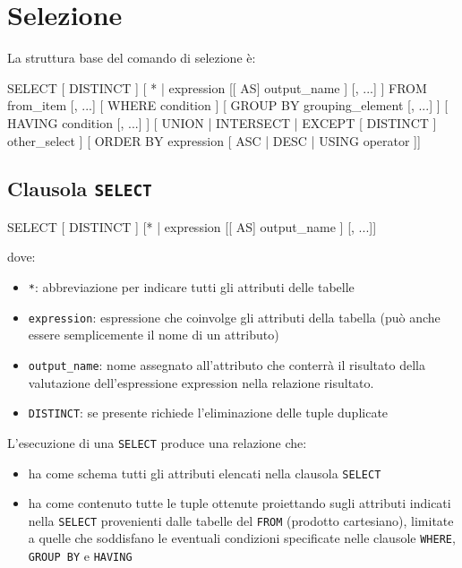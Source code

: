 \section{Selezione}
La struttura base del comando di selezione è:
\begin{codiceSQL}
SELECT [ DISTINCT ]
[ * | expression [[ AS] output_name ] [, 
...] ]
FROM from_item [, ...] 
  [ WHERE condition ]
    [ GROUP BY grouping_element [, ...] ]
      [ HAVING condition [, ...] ]
      [ { UNION | INTERSECT | EXCEPT } [ DISTINCT
      ] other_select ]
        [ ORDER BY expression [ ASC | DESC | USING 
        operator ]]
\end{codiceSQL}


\subsection{Clausola \texttt{SELECT}}
\begin{codiceSQL}
SELECT [ DISTINCT ]
[{* | expression [[ AS] output_name ]} [, ...]]
\end{codiceSQL}

dove:
\begin{itemize}[label=$\triangleright$, itemsep=\smallskipamount]
  \item \texttt{*}: abbreviazione per indicare tutti gli attributi delle tabelle
  \item \texttt{expression}: espressione che coinvolge gli attributi della tabella (può anche essere semplicemente il nome di un attributo)
  \item \texttt{output\_name}: nome assegnato all’attributo che conterrà il risultato della valutazione dell’espressione expression nella relazione risultato.
  \item \texttt{DISTINCT}: se presente richiede l’eliminazione delle tuple duplicate
\end{itemize}

\smallskip
L’esecuzione di una \texttt{SELECT} produce una relazione che:
\begin{itemize}[label=$\circ$, itemsep=\smallskipamount]
  \item ha come schema tutti gli attributi elencati nella clausola \texttt{SELECT}
  \item ha come contenuto tutte le tuple ottenute proiettando sugli attributi indicati nella \texttt{SELECT} provenienti dalle tabelle del \texttt{FROM} (prodotto cartesiano), limitate a quelle che soddisfano le eventuali condizioni specificate nelle clausole \texttt{WHERE}, \texttt{GROUP BY} e \texttt{HAVING}
\end{itemize}

